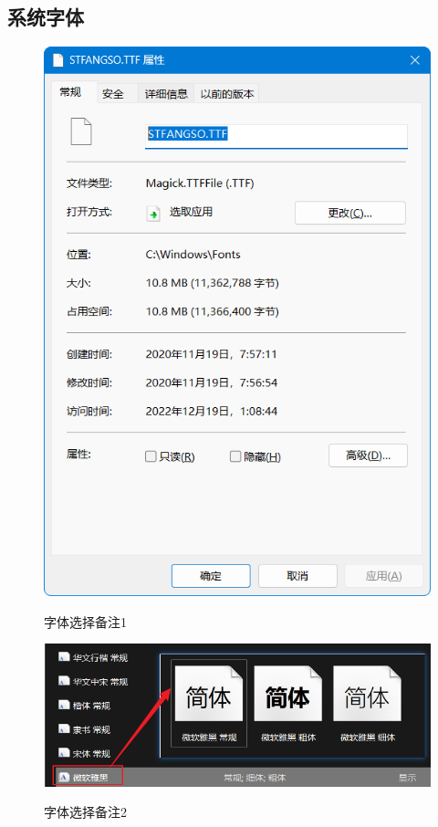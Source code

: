 \documentclass[fontset=windows, 12pt]{article}
\begin{document}
\subsection{系统字体}
\begin{figure}[!htb]
    \begin{minipage}[c]{0.25\linewidth}
            \centering
            \includegraphics[scale=0.25]{../Pic/字体选择.png}
            \label{1}
            \caption{字体选择备注1}
    \end{minipage}
    \hfill
    \begin{minipage}[c]{0.6\linewidth}
        \centering
        \includegraphics[scale=0.5]{../Pic/字体选择2.png}
        \label{2}
        \caption{字体选择备注2}
    \end{minipage}
\end{figure}
\end{document}
